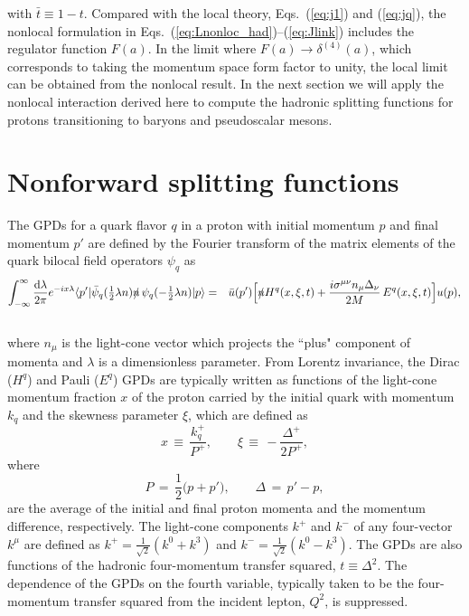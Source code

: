 \documentclass[preprintnumbers,prd,superscriptaddress,preprint]{revtex4-1}
\begin{document}
%
with $\bar t \equiv 1-t$.
%
Compared with the local theory, Eqs.~(\ref{eq:j1}) and (\ref{eq:jq}), the nonlocal  formulation in Eqs.~(\ref{eq:Lnonloc_had})--(\ref{eq:Jlink}) includes the regulator function $F(a)$.
In the limit where $F(a) \to \delta^{(4)}(a)$, which corresponds to taking the momentum space form factor to unity, the local limit can be obtained from the nonlocal result.
In the next section we will apply the nonlocal interaction derived here to compute the hadronic splitting functions for protons transitioning to baryons and pseudoscalar mesons.


\section{Nonforward splitting functions}
\label{sec.splitting}

The GPDs for a quark flavor $q$ in a proton with initial momentum $p$ and final momentum $p'$ are defined by the Fourier transform of the matrix elements of the quark bilocal field operators $\psi_q$ as~\cite{Ji:1996nm}
%
\begin{eqnarray}
\label{eq:GPD}
\int_{-\infty}^{\infty}\frac{\dd{\lambda}}{2\pi} e^{-ix\lambda}
\langle p'| 
    \bar\psi_q (\tfrac12\lambda n) \slashed{n}\, \psi_q(-\tfrac12\lambda n)
|p \rangle 
&=& \bar u(p') 
  \Big[ \slashed n H^q(x,\xi,t) 
      + \frac{i\sigma^{\mu\nu}n_\mu \Delta_\nu}{2M}\, E^q(x,\xi,t)
  \Big] u(p),
\notag\\
& &
\end{eqnarray}
%
where $n_\mu$ is the light-cone vector which projects the ``plus" component of momenta and $\lambda$ is a dimensionless parameter.
From Lorentz invariance, the Dirac ($H^q$) and Pauli ($E^q$) GPDs are typically written as functions of the light-cone momentum fraction $x$ of the proton carried by the initial quark with momentum $k_q$ and the skewness parameter $\xi$, which are defined as
%
\begin{equation}
x\,   \equiv\, \frac{k_q^+}{P^+}, \qquad
\xi\, \equiv\, -\frac{\Delta^+}{2P^+},
\end{equation}
%
where
%
\begin{equation}
P\, =\, \frac12 \big(p + p'\big), \qquad
\Delta\, =\, p' - p,
\end{equation}
%
are the average of the initial and final proton momenta and the momentum difference, respectively. The light-cone components $k^+$ and $k^-$ of any four-vector $k^\mu$ are defined 
as $k^+ = \frac{1}{\sqrt{2}}(k^0+k^3)$ and $k^- = \frac{1}{\sqrt{2}}(k^0-k^3)$.
The GPDs are also functions of the hadronic four-momentum transfer squared, $t \equiv \Delta^2$. %
The dependence of the GPDs on the fourth variable, typically taken to be the four-momentum transfer squared from the incident lepton, $Q^2$, is suppressed.
%
\end{document}

